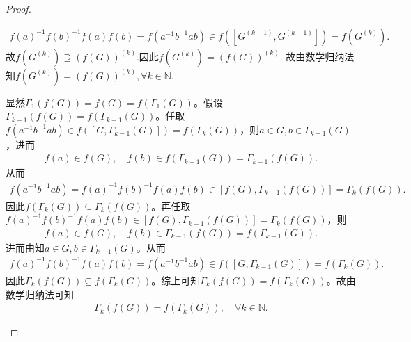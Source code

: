 \documentclass[../../main.tex]{subfiles}%
\begin{document}
\begin{proof}
\begin{enumerate}[(1)]
\begin{align*}
f\left( a \right) ^{-1}f\left( b \right) ^{-1}f\left( a \right) f\left( b \right) =f\left( a^{-1}b^{-1}ab \right) \in f\left( \left[ G^{\left( k-1 \right)},G^{\left( k-1 \right)} \right] \right) =f\left( G^{\left( k \right)} \right) .
\end{align*}
故$f\left( G^{\left( k \right)} \right) \supseteq \left( f\left( G \right) \right) ^{\left( k \right)}.$因此$f\left( G^{\left( k \right)} \right) =\left( f\left( G \right) \right) ^{\left( k \right)}.$
故由数学归纳法知$f\left( G^{\left( k \right)} \right) = \left( f\left( G \right) \right) ^{\left( k \right)},\forall k\in \mathbb{N} .$

显然$\Gamma _1\left( f\left( G \right) \right) =f\left( G \right) =f\left( \Gamma _1\left( G \right) \right)$。假设$\Gamma _{k-1}\left( f\left( G \right) \right) =f\left( \Gamma _{k-1}\left( G \right) \right)$。任取$f\left( a^{-1}b^{-1}ab \right) \in f\left( \left[ G,\Gamma _{k-1}\left( G \right) \right] \right) =f\left( \Gamma _k\left( G \right) \right)$，则$a\in G,b\in \Gamma _{k-1}\left( G \right)$，进而
\begin{align*}
f\left( a \right) \in f\left( G \right),\quad f\left( b \right) \in f\left( \Gamma _{k-1}\left( G \right) \right) =\Gamma _{k-1}\left( f\left( G \right) \right).
\end{align*}
从而
\begin{align*}
f\left( a^{-1}b^{-1}ab \right) =f\left( a \right) ^{-1}f\left( b \right) ^{-1}f\left( a \right) f\left( b \right) \in \left[ f\left( G \right) ,\Gamma _{k-1}\left( f\left( G \right) \right) \right] =\Gamma _k\left( f\left( G \right) \right).
\end{align*}
因此$f\left( \Gamma _k\left( G \right) \right) \subseteq \Gamma _k\left( f\left( G \right) \right)$。再任取$f\left( a \right) ^{-1}f\left( b \right) ^{-1}f\left( a \right) f\left( b \right) \in \left[ f\left( G \right) ,\Gamma _{k-1}\left( f\left( G \right) \right) \right] =\Gamma _k\left( f\left( G \right) \right)$，则
\begin{align*}
f\left( a \right) \in f\left( G \right),\quad f\left( b \right) \in \Gamma _{k-1}\left( f\left( G \right) \right) =f\left( \Gamma _{k-1}\left( G \right) \right).
\end{align*}
进而由知$a\in G,b\in \Gamma _{k-1}\left( G \right)$。从而
\begin{align*}
f\left( a \right) ^{-1}f\left( b \right) ^{-1}f\left( a \right) f\left( b \right) =f\left( a^{-1}b^{-1}ab \right) \in f\left( \left[ G,\Gamma _{k-1}\left( G \right) \right] \right) =f\left( \Gamma _k\left( G \right) \right).
\end{align*}
因此$\Gamma _k\left( f\left( G \right) \right) \subseteq f\left( \Gamma _k\left( G \right) \right)$。综上可知$\Gamma _k\left( f\left( G \right) \right) =f\left( \Gamma _k\left( G \right) \right)$。故由数学归纳法可知
\begin{align*}
\Gamma _k\left( f\left( G \right) \right) =f\left( \Gamma _k\left( G \right) \right),\quad \forall k\in \mathbb{N}.
\end{align*}


\end{enumerate}
\end{proof}
\end{document}
